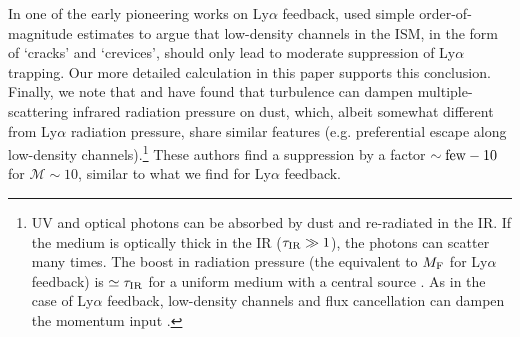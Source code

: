 \documentclass[fleqn,usenatbib]{mnras}
\begin{document}
In one of the early pioneering works on Ly$\alpha$ feedback, \cite{Cox1985} used simple order-of-magnitude estimates to argue that low-density channels in the ISM, in the form of `cracks' and `crevices', should only lead to moderate suppression of Ly$\alpha$ trapping. Our more detailed calculation in this paper supports this conclusion. Finally, we note that \cite{Skinner2015} and \cite{Menon2022_IR} have found that turbulence can dampen multiple-scattering infrared radiation pressure on dust, which, albeit somewhat different from Ly$\alpha$ radiation pressure, share similar features (e.g. preferential escape along low-density channels).\footnote{UV and optical photons can be absorbed by dust and re-radiated in the IR. If the medium is optically thick in the IR ($\tau_{\rm IR} \gg 1$), the photons can scatter many times. The boost in radiation pressure (the equivalent to $M_{\rm F}$ for Ly$\alpha$ feedback) is $\simeq \tau_{\rm IR}$ for a uniform medium with a central source \citep[see e.g. Appendix 6 in][]{Nebrin2022}. As in the case of Ly$\alpha$ feedback, low-density channels and flux cancellation can dampen the momentum input \citep[e.g.][]{Krumholz2009, Krumholz2012, Krumholz2013, Skinner2015, Menon2022_IR}.} These authors find a suppression by a factor $\sim \rm few - 10$ for $\mathcal{M} \sim 10$, similar to what we find for Ly$\alpha$ feedback.
\end{document}
